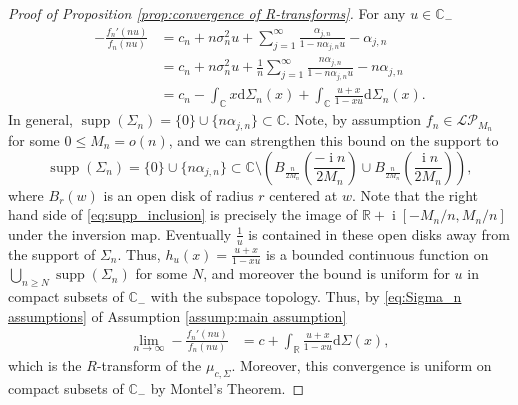 \documentclass[10pt,a4paper]{amsart}
\newcommand{\C}{\mathbb{C}}
\newcommand{\LP}{\mathcal{LP}}
\newcommand{\R}{\mathbb{R}}
\newcommand{\dd}{\mathrm{d}}
\DeclareMathOperator{\ii}{i}
\DeclareMathOperator{\supp}{supp}
\begin{document}
\begin{proof}[Proof of Proposition \ref{prop:convergence of R-transforms}]
	For any $u\in\C_{-}$ \begin{equation}
		\begin{aligned}
			-\frac{f_{n}'(nu)}{f_{n}(nu)}&=c_{n}+n\sigma_{n}^2u+\sum_{j=1}^{\infty}\frac{\alpha_{j,n}}{1-n\alpha_{j,n}u}-\alpha_{j,n}\\
			&=c_n+n\sigma_{n}^{2}u+\frac{1}{n}\sum_{j=1}^{\infty}\frac{n\alpha_{j,n}}{1-n\alpha_{j,n}u}-n\alpha_{j,n}\\
			&=c_n-\int_{\C}x\dd\Sigma_{n}(x)+\int_{\C}\frac{u+x}{1-xu}\dd\Sigma_{n}(x).
		\end{aligned}
	\end{equation}  In general, $\supp\left(\Sigma_{n}\right)=\{0\}\cup\{n\alpha_{j,n}\}\subset\C$. Note, by assumption  $f_{n}\in\LP_{M_n}$ for some $0\leq M_n=o(n)$, and we can strengthen this bound on the support to  \begin{equation}\label{eq:supp_inclusion}
		\supp\left(\Sigma_{n}\right)=\{0\}\cup\{n\alpha_{j,n}\}\subset \C\setminus \left(B_{\frac{n}{2M_n} }\left(\frac{-\ii n}{2M_n}\right)\cup B_{\frac{n}{2M_n} }\left(\frac{\ii n}{2M_n}\right) \right),
	\end{equation} where $B_{r}(w)$ is an open disk of radius $r$ centered at $w$. Note that the right hand side of \eqref{eq:supp_inclusion} is precisely the image of $\R+\ii[-M_n/n,M_n/n]$ under the inversion map. Eventually $\frac{1}{u}$ is contained in these open disks away from the support of $\Sigma_{n}$. Thus, $h_{u}(x)=\frac{u+x}{1-xu}$ is a bounded continuous function on $\bigcup_{n\geq N}\supp\left(\Sigma_{n}\right)$ for some $N$, and moreover the bound is uniform for $u$ in compact subsets of $\C_{-}$ with the subspace topology. Thus, by \eqref{eq:Sigma_n assumptions} of Assumption \ref{assump:main assumption} \begin{equation}
		\begin{aligned}
			\lim\limits_{n\rightarrow\infty}-\frac{f_{n}'(nu)}{f_{n}(nu)}&= c+ \int_{\R}\frac{u+x}{1-xu} \dd\Sigma(x), %
		\end{aligned}
	\end{equation} which is the $R$-transform of the $\mu_{c,\Sigma}$. Moreover, this convergence is uniform on compact subsets of $\C_{-}$ by Montel's Theorem.
	

\end{proof}
\end{document}
